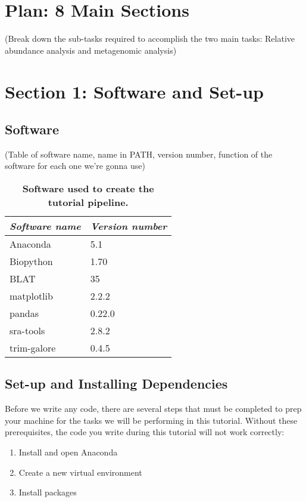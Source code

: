 
\chapter{Plan: 8 Main Sections}
(Break down the sub-tasks required to accomplish the two main tasks: Relative abundance analysis and metagenomic analysis)

\chapter{Section 1: Software and Set-up}
\section{Software}
(Table of software name, name in PATH, version number, function of the software for each one we're gonna use)
%
\begin{table}[htp]
    \begin{center}
    \begin{tabular}{ l | l }
        \textit{Software name} & \textit{Version number} \\ 
        \hline
        Anaconda & 5.1 \\  
        Biopython & 1.70 \\
        BLAT & 35 \\
        matplotlib & 2.2.2 \\
        pandas & 0.22.0 \\
        sra-tools & 2.8.2 \\
        trim-galore & 0.4.5 \\
    \end{tabular}
    \caption{\textbf{Software used to create the tutorial pipeline.}}
    \label{tab:software}
    \end{center}
    \label{software}
\end{table}
%
\section{Set-up and Installing Dependencies}
Before we write any code, there are several steps that must be completed to prep your machine for the tasks we will be performing in this tutorial. Without these prerequisites, the code you write during this tutorial will not work correctly:
\begin{enumerate}
\item Install and open Anaconda
\item Create a new virtual environment
\item Install packages
\end{enumerate}

